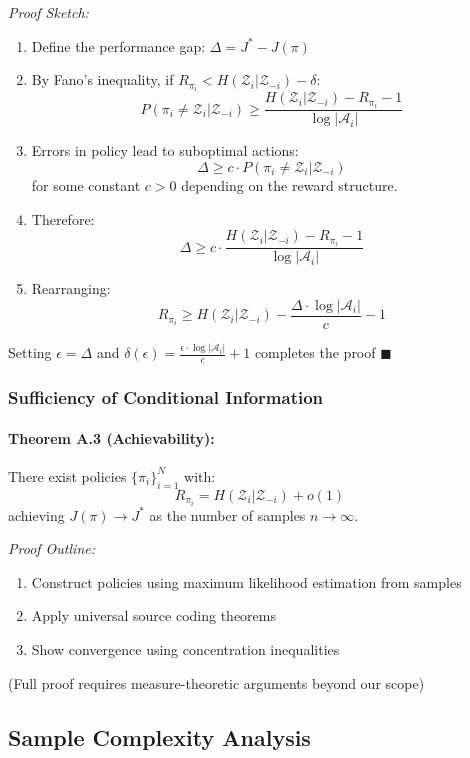 \documentclass[10pt, letterpaper]{article}
\begin{document}
\emph{Proof Sketch:}
\begin{enumerate}
    \item Define the performance gap: $\Delta = J^* - J(\pi)$
    \item By Fano's inequality, if $R_{\pi_i} < H(\mathcal{Z}_i | \mathcal{Z}_{-i}) - \delta$:
    \[P(\pi_i \neq \mathcal{Z}_i | \mathcal{Z}_{-i}) \geq \frac{H(\mathcal{Z}_i | \mathcal{Z}_{-i}) - R_{\pi_i} - 1}{\log |\mathcal{A}_i|}\]
    \item Errors in policy lead to suboptimal actions:
    \[\Delta \geq c \cdot P(\pi_i \neq \mathcal{Z}_i | \mathcal{Z}_{-i})\]
    for some constant $c > 0$ depending on the reward structure.
    \item Therefore:
    \[\Delta \geq c \cdot \frac{H(\mathcal{Z}_i | \mathcal{Z}_{-i}) - R_{\pi_i} - 1}{\log |\mathcal{A}_i|}\]
    \item Rearranging:
    \[R_{\pi_i} \geq H(\mathcal{Z}_i | \mathcal{Z}_{-i}) - \frac{\Delta \cdot \log |\mathcal{A}_i|}{c} - 1\]
\end{enumerate}
Setting $\epsilon = \Delta$ and $\delta(\epsilon) = \frac{\epsilon \cdot \log |\mathcal{A}_i|}{c} + 1$ completes the proof $\blacksquare$

\subsubsection{Sufficiency of Conditional Information}

\paragraph{Theorem A.3 (Achievability):} There exist policies $\{\pi_i\}_{i=1}^N$ with:
\[R_{\pi_i} = H(\mathcal{Z}_i | \mathcal{Z}_{-i}) + o(1)\]
achieving $J(\pi) \to J^*$ as the number of samples $n \to \infty$.

\emph{Proof Outline:}
\begin{enumerate}
    \item Construct policies using maximum likelihood estimation from samples
    \item Apply universal source coding theorems
    \item Show convergence using concentration inequalities
\end{enumerate}
(Full proof requires measure-theoretic arguments beyond our scope)

\subsection{Sample Complexity Analysis}
\end{document}
